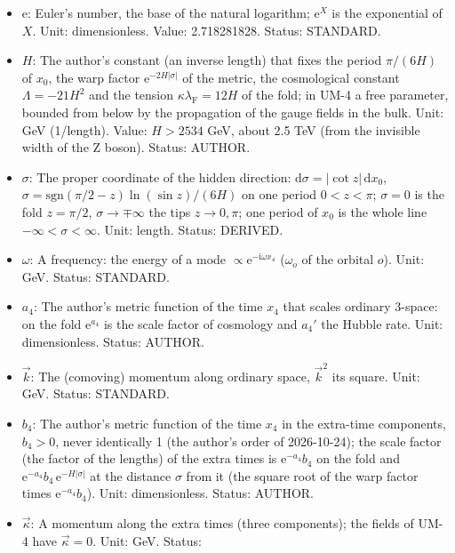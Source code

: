 \documentclass[
  10pt,
]{article}
\providecommand{\tightlist}{%
  \setlength{\itemsep}{0pt}\setlength{\parskip}{0pt}}
\begin{document}
\begin{itemize}
\tightlist
\item
  \(\mathrm{e}\): Euler's number, the base of the natural logarithm;
  \(\mathrm{e}^{X}\) is the exponential of \(X\). Unit: dimensionless.
  Value: 2.718281828. Status: STANDARD.
\item
  \(H\): The author's constant (an inverse length) that fixes the period
  \(\pi/(6H)\) of \(x_0\), the warp factor
  \(\mathrm{e}^{-2H\lvert\sigma\rvert}\) of the metric, the cosmological
  constant \(\Lambda = -21H^2\) and the tension
  \(\kappa\lambda_{\mathrm{F}} = 12H\) of the fold; in UM-4 a free
  parameter, bounded from below by the propagation of the gauge fields
  in the bulk. Unit: GeV (1/length). Value: \(H > 2534\) GeV, about 2.5
  TeV (from the invisible width of the Z boson). Status: AUTHOR.
\item
  \(\sigma\): The proper coordinate of the hidden direction:
  \(\mathrm{d}\sigma = \lvert\cot z\rvert\,\mathrm{d}x_0\),
  \(\sigma = \mathrm{sgn}(\pi/2 - z)\ln(\sin z)/(6H)\) on one period
  \(0 < z < \pi\); \(\sigma = 0\) is the fold \(z = \pi/2\),
  \(\sigma \to \mp\infty\) the tips \(z \to 0, \pi\); one period of
  \(x_0\) is the whole line \(-\infty < \sigma < \infty\). Unit: length.
  Status: DERIVED.
\item
  \(\omega\): A frequency: the energy of a mode
  \(\propto \mathrm{e}^{-\mathrm{i}\omega x_4}\) (\(\omega_o\) of the
  orbital \(o\)). Unit: GeV. Status: STANDARD.
\item
  \(a_4\): The author's metric function of the time \(x_4\) that scales
  ordinary 3-space: on the fold \(\mathrm{e}^{a_4}\) is the scale factor
  of cosmology and \(a_4'\) the Hubble rate. Unit: dimensionless.
  Status: AUTHOR.
\item
  \(\vec k\): The (comoving) momentum along ordinary space, \(\vec k^2\)
  its square. Unit: GeV. Status: STANDARD.
\item
  \(b_4\): The author's metric function of the time \(x_4\) in the
  extra-time components, \(b_4 > 0\), never identically 1 (the author's
  order of 2026-10-24); the scale factor (the factor of the lengths) of
  the extra times is \(\mathrm{e}^{-a_4}b_4\) on the fold and
  \(\mathrm{e}^{-a_4}b_4\,\mathrm{e}^{-H\lvert\sigma\rvert}\) at the
  distance \(\sigma\) from it (the square root of the warp factor times
  \(\mathrm{e}^{-a_4}b_4\)). Unit: dimensionless. Status: AUTHOR.
\item
  \(\vec\kappa\): A momentum along the extra times (three components);
  the fields of UM-4 have \(\vec\kappa = 0\). Unit: GeV. Status:

\end{itemize}
\end{document}
